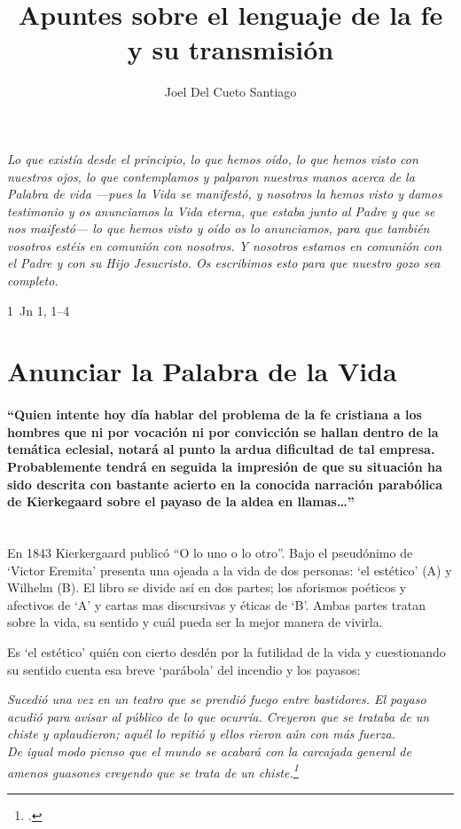 \documentclass[10pt]{article}
\title{Apuntes sobre el lenguaje de la fe y su transmisión}
\author{Joel Del Cueto Santiago}
\date{}
\newcommand{\citalitlar}[1]{
\begin{adjustwidth}{1.2cm}{}
\emph{#1}
\end{adjustwidth}
}
\begin{document}
\maketitle

\emph{Lo que existía desde el principio, lo que hemos oído,
lo que hemos visto con nuestros ojos,
lo que contemplamos
y palparon nuestras manos
acerca de la Palabra de vida
---pues la Vida se manifestó,
y nosotros la hemos visto y damos testimonio
y os anunciamos la Vida eterna,
que estaba junto al Padre y que se nos maifestó---
lo que hemos visto y oído os lo anunciamos,
para que también vosotros estéis en comunión con nosotros.
Y nosotros estamos en comunión con el Padre y con su Hijo Jesucristo.
Os escribimos esto para que nuestro gozo sea completo.}
\begin{flushright}
1~Jn 1, 1--4\end
{flushright}

\section{Anunciar la Palabra de la Vida}
\paragraph{``Quien intente hoy día hablar del problema de la fe cristiana a los
  hombres que ni por vocación ni por convicción se hallan dentro de la temática
  eclesial, notará al punto la ardua dificultad de tal empresa. Probablemente
  tendrá en seguida la impresión de que su situación ha sido descrita con
  bastante acierto en la conocida narración parabólica de
  Kierkegaard sobre el payaso de la aldea en llamas\ldots''\\\\
}

En 1843 Kierkergaard publicó ``O lo uno o lo otro''. Bajo el pseudónimo de
`Victor Eremita' presenta una ojeada a la vida de dos personas: `el estético'
(A) y Wilhelm (B). El libro se divide así en dos partes; los aforismos
poéticos y afectivos de `A' y cartas mas discursivas y éticas de `B'. Ambas
partes tratan sobre la vida, su sentido y cuál pueda ser la mejor manera de
vivirla.

Es `el estético' quién con cierto desdén por la futilidad de la vida y
cuestionando su sentido cuenta esa breve `parábola' del incendio y los
payasos: \citalitlar{Sucedió una vez en un teatro que se prendió fuego entre
  bastidores. El payaso acudió para avisar al público de lo que ocurría.
  Creyeron que se trataba de un chiste y aplaudieron; aquél lo repitió y ellos
  rieron aún con más fuerza.\\ De igual modo pienso que el mundo se acabará
  con la carcajada general de amenos guasones creyendo que se trata de un
  chiste.\footcite{kierkegaard2006uno}}
\end{document}
